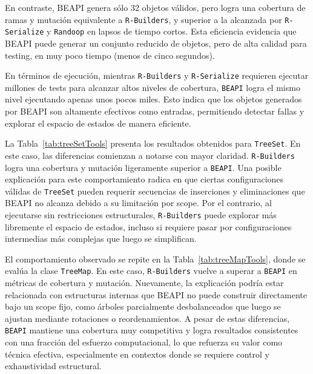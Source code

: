 En contraste, \textsf{BEAPI} genera sólo 32 objetos válidos, pero logra una cobertura de ramas y 
mutación equivalente a \texttt{R-Builders}, y superior a la alcanzada por \texttt{R-Serialize} y 
\texttt{Randoop} en lapsos de tiempo cortos. Esta eficiencia evidencia que BEAPI puede generar un 
conjunto reducido de objetos, pero de alta calidad para testing, en muy poco tiempo (menos de cinco 
segundos).

En términos de ejecución, mientras \texttt{R-Builders} y \texttt{R-Serialize} requieren ejecutar 
millones de tests para alcanzar altos niveles de cobertura, \texttt{BEAPI} logra el mismo nivel 
ejecutando apenas unos pocos miles. Esto indica que los objetos generados por \textsf{BEAPI} son 
altamente efectivos como entradas, permitiendo detectar fallas y explorar el espacio de estados 
de manera eficiente.

La Tabla~\ref{tab:treeSetTools} presenta los resultados obtenidos para \texttt{TreeSet}. En 
este caso, las diferencias comienzan a notarse con mayor claridad. \texttt{R-Builders} logra 
una cobertura y mutación ligeramente superior a \texttt{BEAPI}. Una posible explicación para 
este comportamiento radica en que ciertas configuraciones válidas de \texttt{TreeSet} pueden 
requerir secuencias de inserciones y eliminaciones que BEAPI no alcanza debido a su 
limitación por scope. Por el contrario, al ejecutarse sin restricciones estructurales, 
\texttt{R-Builders} puede explorar más libremente el espacio de estados, incluso si requiere 
pasar por configuraciones intermedias más complejas que luego se simplifican.

El comportamiento observado se repite en la Tabla~\ref{tab:treeMapTools}, donde se evalúa la 
clase \texttt{TreeMap}. En este caso, \texttt{R-Builders} vuelve a superar a \texttt{BEAPI} 
en métricas de cobertura y mutación. Nuevamente, la explicación podría estar relacionada con 
estructuras internas que BEAPI no puede construir directamente bajo un scope fijo, como 
árboles parcialmente desbalanceados que luego se ajustan mediante rotaciones o reordenamientos. 
A pesar de estas diferencias, \texttt{BEAPI} mantiene una cobertura muy competitiva y logra 
resultados consistentes con una fracción del esfuerzo computacional, lo que refuerza su valor 
como técnica efectiva, especialmente en contextos donde se requiere control y exhaustividad 
estructural.

